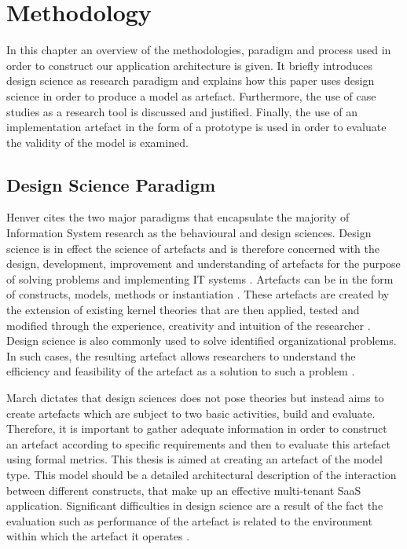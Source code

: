 \chapter{Methodology}

In this chapter an overview of the methodologies, paradigm and process used in order to construct our application architecture is given. It briefly introduces design science as research paradigm and explains how this paper uses design science in order to produce a model as artefact. Furthermore, the use of case studies as a research tool is discussed and justified. Finally, the use of an implementation artefact in the form of a prototype  is used in order to evaluate the validity of the model is examined.

\section{Design Science Paradigm}

Henver \cite{Hevner2004} cites the two major paradigms that encapsulate the majority of Information System research as the behavioural and design sciences. Design science is in effect the science of artefacts and is therefore concerned with the design, development, improvement and understanding of artefacts for the purpose of solving problems and implementing IT systems \cite{March1995a}. Artefacts can be in the form of constructs, models, methods or instantiation \cite{Hevner2004}. These artefacts are created by the extension of existing kernel theories that are then applied, tested and modified through the experience, creativity and intuition of the researcher \cite{Walls1992}. Design science is also commonly used to solve identified organizational problems. In such cases, the resulting artefact allows researchers to understand the efficiency and feasibility of the artefact as a solution to such a problem \cite{Hevner2004}.
 
March \cite{March1995a} dictates that design sciences does not pose theories but instead aims to create artefacts which are subject to two basic activities, build and evaluate. Therefore, it is important to gather adequate information in order to construct an artefact according to specific requirements and then to evaluate this artefact using formal metrics. This thesis is aimed at creating an artefact of the model type. This model should be a detailed architectural description of the interaction between different constructs, that make up an effective multi-tenant  SaaS application. Significant difficulties in design science are a result of the fact the evaluation such as performance of the artefact is related to the environment within which the artefact it operates \cite{March1995a}.


